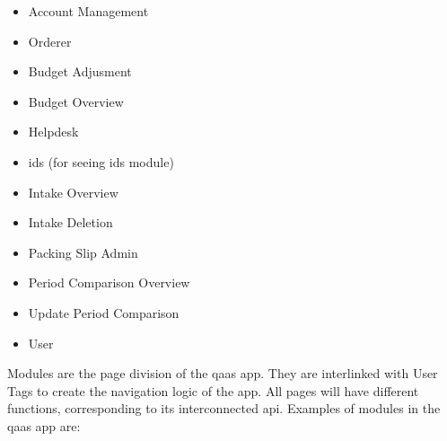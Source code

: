 \begin{itemize}
      \item Account Management
      \item Orderer
      \item Budget Adjusment
      \item Budget Overview
      \item Helpdesk
      \item \acrshort{ids} (for seeing \acrshort{ids} module)
      \item Intake Overview
      \item Intake Deletion
      \item Packing Slip Admin
      \item Period Comparison Overview
      \item Update Period Comparison
      \item User
\end{itemize}




Modules are the page division of the \acrshort{qaas} app. They are interlinked with User Tags to create the navigation logic of the app.
All pages will have different functions, corresponding to its interconnected \acrshort{api}. Examples of modules in the \acrshort{qaas} app
are:

